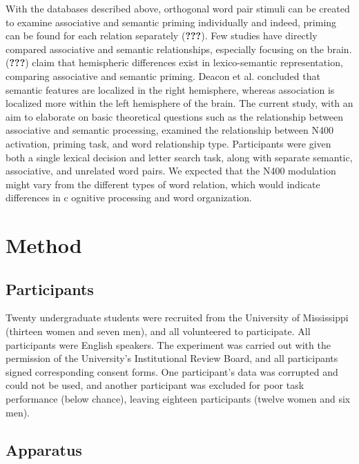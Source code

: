 \documentclass[english,man]{apa6}
\theoremstyle{definition}
\theoremstyle{definition}
\theoremstyle{definition}
\theoremstyle{remark}
\begin{document}
With the databases described above, orthogonal word pair stimuli can be
created to examine associative and semantic priming individually and
indeed, priming can be found for each relation separately
({\textbf{???}}). Few studies have directly compared associative and
semantic relationships, especially focusing on the brain.
({\textbf{???}}) claim that hemispheric differences exist in
lexico-semantic representation, comparing associative and semantic
priming. Deacon et al. concluded that semantic features are localized in
the right hemisphere, whereas association is localized more within the
left hemisphere of the brain. The current study, with an aim to
elaborate on basic theoretical questions such as the relationship
between associative and semantic processing, examined the relationship
between N400 activation, priming task, and word relationship type.
Participants were given both a single lexical decision and letter search
task, along with separate semantic, associative, and unrelated word
pairs. We expected that the N400 modulation might vary from the
different types of word relation, which would indicate differences in c
ognitive processing and word organization.

\section{Method}\label{method}

\subsection{Participants}\label{participants}

Twenty undergraduate students were recruited from the University of
Mississippi (thirteen women and seven men), and all volunteered to
participate. All participants were English speakers. The experiment was
carried out with the permission of the University's Institutional Review
Board, and all participants signed corresponding consent forms. One
participant's data was corrupted and could not be used, and another
participant was excluded for poor task performance (below chance),
leaving eighteen participants (twelve women and six men).

\subsection{Apparatus}\label{apparatus}
\end{document}
